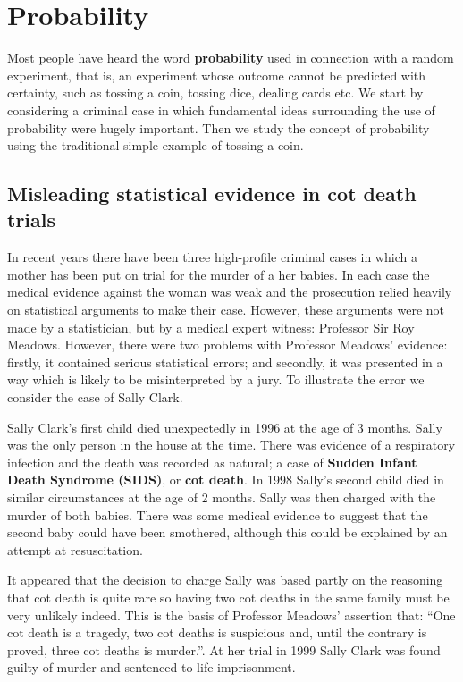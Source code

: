 \documentclass[
  11pt,
  british,
  openany, a4paper]{book}
\begin{document}
\hypertarget{probability}{%
\chapter{Probability}\label{probability}}

Most people have heard the word \textbf{probability} used in connection with a random experiment, that is, an experiment whose outcome cannot be predicted with certainty, such as tossing a coin, tossing dice, dealing cards etc. We start by considering a criminal case in which fundamental ideas surrounding the use of probability were hugely important. Then we study the concept of probability using the traditional simple example of tossing a coin.

\hypertarget{sids}{%
\section{Misleading statistical evidence in cot death trials}\label{sids}}

In recent years there have been three high-profile criminal cases in which a mother has been put on trial for the murder of a her babies. In each case the medical evidence against the woman was weak and the prosecution relied heavily on statistical arguments to make their case. However, these arguments were not made by a statistician, but by a medical expert witness: Professor Sir Roy Meadows. However, there were two problems with Professor Meadows' evidence: firstly, it contained serious statistical errors; and secondly, it was presented in a way which is likely to be misinterpreted by a jury. To illustrate the error we consider the case of Sally Clark.

Sally Clark's first child died unexpectedly in 1996 at the age of 3 months. Sally was the only person in the house at the time. There was evidence of a respiratory infection and the death was recorded as natural; a case of \textbf{Sudden Infant Death Syndrome (SIDS)}, or \textbf{cot death}. In 1998 Sally's second child died in similar circumstances at the age of 2 months. Sally was then charged with the murder of both babies. There was some medical evidence to suggest that the second baby could have been smothered, although this could be explained by an attempt at resuscitation.

It appeared that the decision to charge Sally was based partly on the reasoning that cot death is quite rare so having two cot deaths in the same family must be very unlikely indeed. This is the basis of Professor Meadows' assertion that: ``One cot death is a tragedy, two cot deaths is suspicious and, until the contrary is proved, three cot deaths is murder.''. At her trial in 1999 Sally Clark was found guilty of murder and sentenced to life imprisonment.
\end{document}
